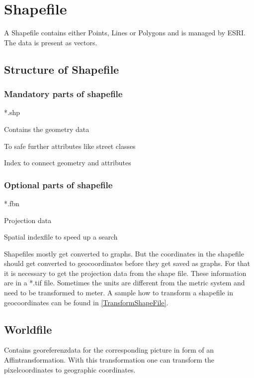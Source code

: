 \chapter{Shapefile}
\label{ch:shapefile}

A Shapefile contains either Points, Lines or Polygons and is managed by ESRI. The data is present as vectors.

\section{Structure of Shapefile}
\label{sec:structure}

\subsection{Mandatory parts of shapefile}
\label{subsec:Mandatory-parts-of-shapefile}

\begin{labeling}[:]{*.shp}
    \item[*.shp]Contains the geometry data
    \item[*.dbf]To safe further attributes like street classes
    \item[*.shx]Index to connect geometry and attributes
\end{labeling}

\subsection{Optional parts of shapefile}
\label{subsec:optional-parts-of-shapefile}

\begin{labeling}[:]{*.fbn}
    \item[*.prj]Projection data
    \item[*.fbn]Spatial indexfile to speed up a search
\end{labeling}

Shapefiles mostly get converted to graphs.
But the coordinates in the shapefile should get converted to geocoordinates before they get saved as graphs.
For that it is necessary to get the projection data from the shape file.
These information are in a *.tif file.
Sometimes the units are different from the metric system and need to be transformed to meter.
A sample how to transform a shapefile in geocoordinates can be found in \ref{TransformShapeFile}.

\section{Worldfile}
\label{sec:worldfile}
Contains georeferenzdata for the corresponding picture in form of an Affintransformation.
With this transformation one can transform the pixelcoordinates to geographic coordinates.


